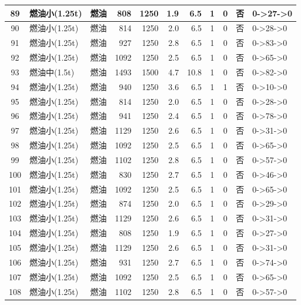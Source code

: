 \begin{landscape}
\begin{longtable}{|c|l|c|r|r|r|r|c|c|c|p{2.8cm}|}
\hline
\rowcolor{gray!8}
89 & 燃油小(1.25t) & 燃油 & 808 & 1250 & 1.9 & 6.5 & 1 & 0 & 否 & 0->27->0 \\
\hline
90 & 燃油小(1.25t) & 燃油 & 814 & 1250 & 2.0 & 6.5 & 1 & 0 & 否 & 0->28->0 \\
\hline
\rowcolor{gray!8}
91 & 燃油小(1.25t) & 燃油 & 927 & 1250 & 2.8 & 6.5 & 1 & 0 & 否 & 0->83->0 \\
\hline
92 & 燃油小(1.25t) & 燃油 & 1092 & 1250 & 2.5 & 6.5 & 1 & 0 & 否 & 0->65->0 \\
\hline
\rowcolor{gray!8}
93 & 燃油中(1.5t) & 燃油 & 1493 & 1500 & 4.7 & 10.8 & 1 & 0 & 否 & 0->82->0 \\
\hline
94 & 燃油小(1.25t) & 燃油 & 940 & 1250 & 3.6 & 6.5 & 1 & 1 & 否 & 0->10->0 \\
\hline
\rowcolor{gray!8}
95 & 燃油小(1.25t) & 燃油 & 814 & 1250 & 2.0 & 6.5 & 1 & 0 & 否 & 0->28->0 \\
\hline
96 & 燃油小(1.25t) & 燃油 & 941 & 1250 & 2.4 & 6.5 & 1 & 0 & 否 & 0->78->0 \\
\hline
\rowcolor{gray!8}
97 & 燃油小(1.25t) & 燃油 & 1129 & 1250 & 2.6 & 6.5 & 1 & 0 & 否 & 0->31->0 \\
\hline
98 & 燃油小(1.25t) & 燃油 & 1092 & 1250 & 2.5 & 6.5 & 1 & 0 & 否 & 0->65->0 \\
\hline
\rowcolor{gray!8}
99 & 燃油小(1.25t) & 燃油 & 1102 & 1250 & 2.8 & 6.5 & 1 & 0 & 否 & 0->57->0 \\
\hline
100 & 燃油小(1.25t) & 燃油 & 830 & 1250 & 2.7 & 6.5 & 1 & 0 & 否 & 0->46->0 \\
\hline
\rowcolor{gray!8}
101 & 燃油小(1.25t) & 燃油 & 1092 & 1250 & 2.5 & 6.5 & 1 & 0 & 否 & 0->65->0 \\
\hline
102 & 燃油小(1.25t) & 燃油 & 874 & 1250 & 2.0 & 6.5 & 1 & 0 & 否 & 0->29->0 \\
\hline
\rowcolor{gray!8}
103 & 燃油小(1.25t) & 燃油 & 1129 & 1250 & 2.6 & 6.5 & 1 & 0 & 否 & 0->31->0 \\
\hline
104 & 燃油小(1.25t) & 燃油 & 808 & 1250 & 1.9 & 6.5 & 1 & 0 & 否 & 0->27->0 \\
\hline
\rowcolor{gray!8}
105 & 燃油小(1.25t) & 燃油 & 1129 & 1250 & 2.6 & 6.5 & 1 & 0 & 否 & 0->31->0 \\
\hline
106 & 燃油小(1.25t) & 燃油 & 931 & 1250 & 2.7 & 6.5 & 1 & 0 & 否 & 0->74->0 \\
\hline
\rowcolor{gray!8}
107 & 燃油小(1.25t) & 燃油 & 1092 & 1250 & 2.5 & 6.5 & 1 & 0 & 否 & 0->65->0 \\
\hline
108 & 燃油小(1.25t) & 燃油 & 1102 & 1250 & 2.8 & 6.5 & 1 & 0 & 否 & 0->57->0 \\

\end{longtable}
\end{landscape}
